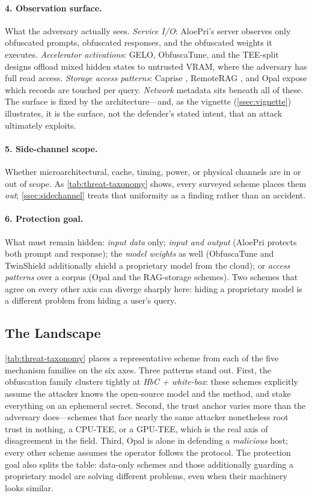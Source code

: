 \paragraph{4. Observation surface.}
What the adversary actually sees. \emph{Service I/O}: AloePri's server observes
only obfuscated prompts, obfuscated responses, and the obfuscated weights it
executes. \emph{Accelerator activations}: GELO, ObfuscaTune, and the TEE-split
designs offload mixed hidden states to untrusted VRAM, where the adversary has
full read access. \emph{Storage access patterns}: Caprise \citep{ye_caprise},
RemoteRAG \citep{cheng2025remoterag}, and Opal expose which records are
touched per query. \emph{Network} metadata sits beneath all of these. The
surface is fixed by the architecture---and, as the vignette
(\cref{ssec:vignette}) illustrates, it is the surface, not the defender's stated
intent, that an attack ultimately exploits.

\paragraph{5. Side-channel scope.}
Whether microarchitectural, cache, timing, power, or physical channels are in
or out of scope. As \cref{tab:threat-taxonomy} shows, every surveyed scheme
places them \emph{out}; \cref{ssec:sidechannel} treats that uniformity as a
finding rather than an accident.

\paragraph{6. Protection goal.}
What must remain hidden: \emph{input data} only; \emph{input and output}
(AloePri protects both prompt and response); the \emph{model weights} as well
(ObfuscaTune and TwinShield additionally shield a proprietary model from the
cloud); or \emph{access patterns} over a corpus (Opal and the RAG-storage
schemes). Two schemes that agree on every other axis can diverge sharply here:
hiding a proprietary model is a different problem from hiding a user's query.

\subsection{The Landscape}
\label{sec:threat-landscape}

\cref{tab:threat-taxonomy} places a representative scheme from each of the five
mechanism families on the six axes. Three patterns stand out. First, the
obfuscation family clusters tightly at \emph{HbC + white-box}: these schemes
explicitly assume the attacker knows the open-source model and the method, and
stake everything on an ephemeral secret. Second, the trust anchor varies more
than the adversary does---schemes that face nearly the same attacker
nonetheless root trust in nothing, a CPU-TEE, or a GPU-TEE, which is the real
axis of disagreement in the field. Third, Opal is alone in defending a
\emph{malicious} host; every other scheme assumes the operator follows the
protocol. The protection goal also splits the table: data-only schemes and
those additionally guarding a proprietary model are solving different
problems, even when their machinery looks similar.

